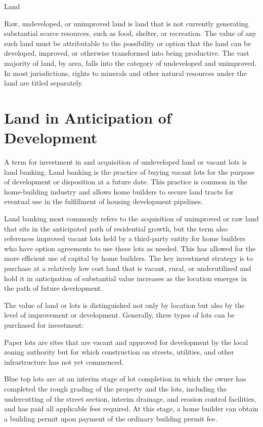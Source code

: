 \documentclass[11pt]{article}
\begin{document}
Land

Raw, undeveloped, or unimproved land is land that is not currently generating substantial scarce resources, such as food, shelter, or recreation. The value of any such land must be attributable to the possibility or option that the land can be developed, improved, or otherwise transformed into being productive. The vast majority of land, by area, falls into the category of undeveloped and unimproved. In most jurisdictions, rights to minerals and other natural resources under the land are titled separately.

\section*{Land in Anticipation of Development}
A term for investment in and acquisition of undeveloped land or vacant lots is land banking. Land banking is the practice of buying vacant lots for the purpose of development or disposition at a future date. This practice is common in the home-building industry and allows home builders to secure land tracts for eventual use in the fulfillment of housing development pipelines.

Land banking most commonly refers to the acquisition of unimproved or raw land that sits in the anticipated path of residential growth, but the term also references improved vacant lots held by a third-party entity for home builders who have option agreements to use these lots as needed. This has allowed for the more efficient use of capital by home builders. The key investment strategy is to purchase at a relatively low cost land that is vacant, rural, or underutilized and hold it in anticipation of substantial value increases as the location emerges in the path of future development.

The value of land or lots is distinguished not only by location but also by the level of improvement or development. Generally, three types of lots can be purchased for investment:

Paper lots are sites that are vacant and approved for development by the local zoning authority but for which construction on streets, utilities, and other infrastructure has not yet commenced.

Blue top lots are at an interim stage of lot completion in which the owner has completed the rough grading of the property and the lots, including the undercutting of the street section, interim drainage, and erosion control facilities, and has paid all applicable fees required. At this stage, a home builder can obtain a building permit upon payment of the ordinary building permit fee.
\end{document}
